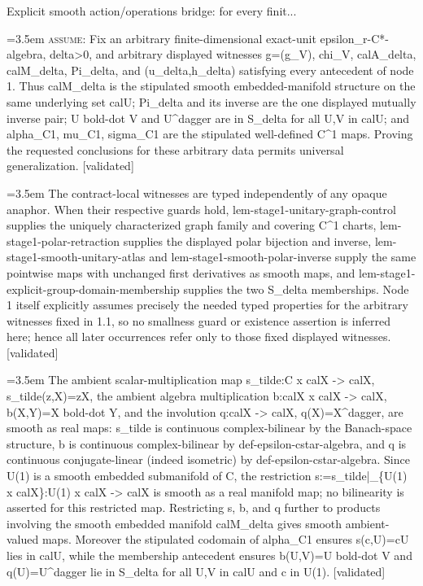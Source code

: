 \documentclass{article}
\newcommand{\step}[1]{\par\noindent\hangindent=3.5em\hangafter=1%
  \makebox[3.5em][l]{\textbf{#1.}}}
\newcommand{\steptag}[1]{\hfill{\small\textsf{[#1]}}}
\begin{document}
\begin{proofbox}{Explicit smooth action/operations bridge: for every finit...}
\step{1.1} \textsc{assume}: Fix an arbitrary finite-dimensional exact-unit epsilon\_r-C*-algebra, delta>0, and arbitrary displayed witnesses g=(g\_V), chi\_V, calA\_delta, calM\_delta, Pi\_delta, and (u\_delta,h\_delta) satisfying every antecedent of node 1. Thus calM\_delta is the stipulated smooth embedded-manifold structure on the same underlying set calU; Pi\_delta and its inverse are the one displayed mutually inverse pair; U bold-dot V and U\textasciicircum{}dagger are in S\_delta for all U,V in calU; and alpha\_C1, mu\_C1, sigma\_C1 are the stipulated well-defined C\textasciicircum{}1 maps. Proving the requested conclusions for these arbitrary data permits universal generalization. \steptag{validated} \\[4pt]
\step{1.2} The contract-local witnesses are typed independently of any opaque anaphor. When their respective guards hold, lem-stage1-unitary-graph-control supplies the uniquely characterized graph family and covering C\textasciicircum{}1 charts, lem-stage1-polar-retraction supplies the displayed polar bijection and inverse, lem-stage1-smooth-unitary-atlas and lem-stage1-smooth-polar-inverse supply the same pointwise maps with unchanged first derivatives as smooth maps, and lem-stage1-explicit-group-domain-membership supplies the two S\_delta memberships. Node 1 itself explicitly assumes precisely the needed typed properties for the arbitrary witnesses fixed in 1.1, so no smallness guard or existence assertion is inferred here; hence all later occurrences refer only to those fixed displayed witnesses. \steptag{validated} \\[4pt]
\step{1.3} The ambient scalar-multiplication map s\_tilde:C x calX -> calX, s\_tilde(z,X)=zX, the ambient algebra multiplication b:calX x calX -> calX, b(X,Y)=X bold-dot Y, and the involution q:calX -> calX, q(X)=X\textasciicircum{}dagger, are smooth as real maps: s\_tilde is continuous complex-bilinear by the Banach-space structure, b is continuous complex-bilinear by def-epsilon-cstar-algebra, and q is continuous conjugate-linear (indeed isometric) by def-epsilon-cstar-algebra. Since U(1) is a smooth embedded submanifold of C, the restriction s:=s\_tilde|\_\{U(1) x calX\}:U(1) x calX -> calX is smooth as a real manifold map; no bilinearity is asserted for this restricted map. Restricting s, b, and q further to products involving the smooth embedded manifold calM\_delta gives smooth ambient-valued maps. Moreover the stipulated codomain of alpha\_C1 ensures s(c,U)=cU lies in calU, while the membership antecedent ensures b(U,V)=U bold-dot V and q(U)=U\textasciicircum{}dagger lie in S\_delta for all U,V in calU and c in U(1). \steptag{validated} \\[4pt]

\end{proofbox}
\end{document}
